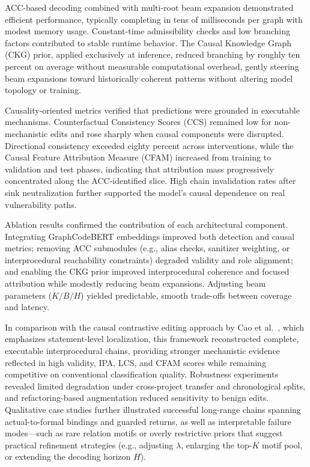 \documentclass{buthesis}
\begin{document}
ACC-based decoding combined with multi-root beam expansion demonstrated efficient performance, typically completing in tens of milliseconds per graph with modest memory usage. Constant-time admissibility checks and low branching factors contributed to stable runtime behavior. The Causal Knowledge Graph (CKG) prior, applied exclusively at inference, reduced branching by roughly ten percent on average without measurable computational overhead, gently steering beam expansions toward historically coherent patterns without altering model topology or training.

Causality-oriented metrics verified that predictions were grounded in executable mechanisms. Counterfactual Consistency Scores (CCS) remained low for non-mechanistic edits and rose sharply when causal components were disrupted. Directional consistency exceeded eighty percent across interventions, while the Causal Feature Attribution Measure (CFAM) increased from training to validation and test phases, indicating that attribution mass progressively concentrated along the ACC-identified slice. High chain invalidation rates after sink neutralization further supported the model’s causal dependence on real vulnerability paths.

Ablation results confirmed the contribution of each architectural component. Integrating GraphCodeBERT embeddings improved both detection and causal metrics; removing ACC submodules (e.g., alias checks, sanitizer weighting, or interprocedural reachability constraints) degraded validity and role alignment; and enabling the CKG prior improved interprocedural coherence and focused attribution while modestly reducing beam expansions. Adjusting beam parameters ($K/B/H$) yielded predictable, smooth trade-offs between coverage and latency.

In comparison with the causal contrastive editing approach by Cao et al.~\cite{Cao2024ICSE}, which emphasizes statement-level localization, this framework reconstructed complete, executable interprocedural chains, providing stronger mechanistic evidence reflected in high validity, IPA, LCS, and CFAM scores while remaining competitive on conventional classification quality. Robustness experiments revealed limited degradation under cross-project transfer and chronological splits, and refactoring-based augmentation reduced sensitivity to benign edits. Qualitative case studies further illustrated successful long-range chains spanning actual-to-formal bindings and guarded returns, as well as interpretable failure modes—such as rare relation motifs or overly restrictive priors that suggest practical refinement strategies (e.g., adjusting $\lambda$, enlarging the top-$K$ motif pool, or extending the decoding horizon $H$).
\end{document}
